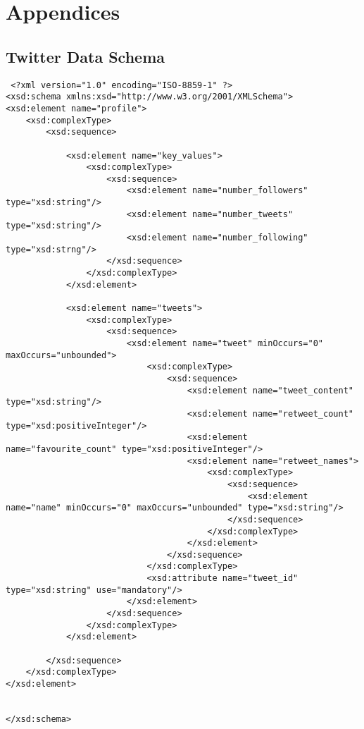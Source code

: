 \chapter{Appendices}\label{C:us}

\section{Twitter Data Schema}

\begin{verbatim}
 <?xml version="1.0" encoding="ISO-8859-1" ?>
<xsd:schema xmlns:xsd="http://www.w3.org/2001/XMLSchema">
<xsd:element name="profile">
	<xsd:complexType>
		<xsd:sequence>

			<xsd:element name="key_values">
				<xsd:complexType>
					<xsd:sequence>
						<xsd:element name="number_followers" type="xsd:string"/>
						<xsd:element name="number_tweets" type="xsd:string"/>
						<xsd:element name="number_following" type="xsd:strng"/>
					</xsd:sequence>
				</xsd:complexType>
			</xsd:element>

			<xsd:element name="tweets">
				<xsd:complexType>
					<xsd:sequence>
						<xsd:element name="tweet" minOccurs="0" maxOccurs="unbounded">
							<xsd:complexType>
								<xsd:sequence>
									<xsd:element name="tweet_content" type="xsd:string"/>
									<xsd:element name="retweet_count" type="xsd:positiveInteger"/>
									<xsd:element name="favourite_count" type="xsd:positiveInteger"/>
									<xsd:element name="retweet_names">
										<xsd:complexType>
											<xsd:sequence>
												<xsd:element name="name" minOccurs="0" maxOccurs="unbounded" type="xsd:string"/>
											</xsd:sequence>
										</xsd:complexType>
									</xsd:element>
								</xsd:sequence>
							</xsd:complexType>
							<xsd:attribute name="tweet_id" type="xsd:string" use="mandatory"/>
						</xsd:element>
					</xsd:sequence>
				</xsd:complexType>
			</xsd:element>

		</xsd:sequence>
	</xsd:complexType>
</xsd:element>	


</xsd:schema>
\end{verbatim}

